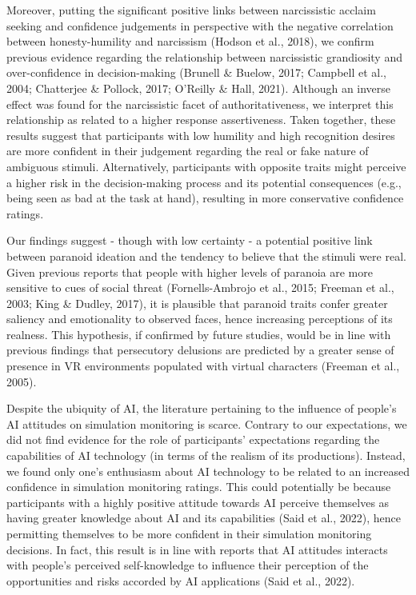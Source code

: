 \documentclass[
  man,
  floatsintext,
  longtable,
  nolmodern,
  notxfonts,
  notimes,
  colorlinks=true,linkcolor=blue,citecolor=blue,urlcolor=blue]{apa7}
\begin{document}
Moreover, putting the significant positive links between narcissistic
acclaim seeking and confidence judgements in perspective with the
negative correlation between honesty-humility and narcissism (Hodson et
al., 2018), we confirm previous evidence regarding the relationship
between narcissistic grandiosity and over-confidence in decision-making
(Brunell \& Buelow, 2017; Campbell et al., 2004; Chatterjee \& Pollock,
2017; O'Reilly \& Hall, 2021). Although an inverse effect was found for
the narcissistic facet of authoritativeness, we interpret this
relationship as related to a higher response assertiveness. Taken
together, these results suggest that participants with low humility and
high recognition desires are more confident in their judgement regarding
the real or fake nature of ambiguous stimuli. Alternatively,
participants with opposite traits might perceive a higher risk in the
decision-making process and its potential consequences (e.g., being seen
as bad at the task at hand), resulting in more conservative confidence
ratings.

Our findings suggest - though with low certainty - a potential positive
link between paranoid ideation and the tendency to believe that the
stimuli were real. Given previous reports that people with higher levels
of paranoia are more sensitive to cues of social threat
(Fornells-Ambrojo et al., 2015; Freeman et al., 2003; King \& Dudley,
2017), it is plausible that paranoid traits confer greater saliency and
emotionality to observed faces, hence increasing perceptions of its
realness. This hypothesis, if confirmed by future studies, would be in
line with previous findings that persecutory delusions are predicted by
a greater sense of presence in VR environments populated with virtual
characters (Freeman et al., 2005).

Despite the ubiquity of AI, the literature pertaining to the influence
of people's AI attitudes on simulation monitoring is scarce. Contrary to
our expectations, we did not find evidence for the role of participants'
expectations regarding the capabilities of AI technology (in terms of
the realism of its productions). Instead, we found only one's enthusiasm
about AI technology to be related to an increased confidence in
simulation monitoring ratings. This could potentially be because
participants with a highly positive attitude towards AI perceive
themselves as having greater knowledge about AI and its capabilities
(Said et al., 2022), hence permitting themselves to be more confident in
their simulation monitoring decisions. In fact, this result is in line
with reports that AI attitudes interacts with people's perceived
self-knowledge to influence their perception of the opportunities and
risks accorded by AI applications (Said et al., 2022).
\end{document}
